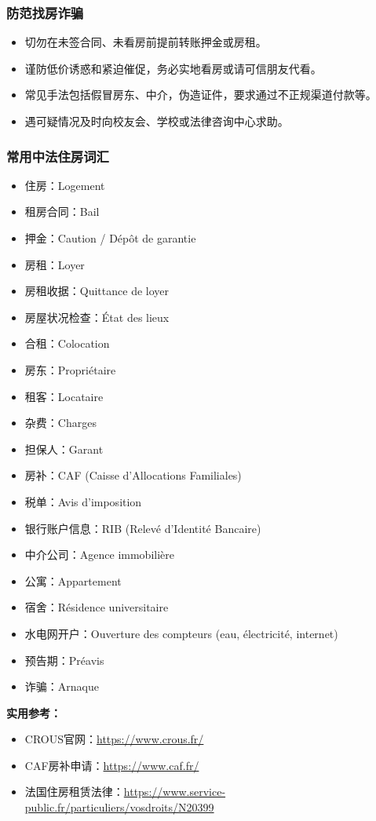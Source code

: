 \subsubsection{防范找房诈骗}
\begin{itemize}
    \item 切勿在未签合同、未看房前提前转账押金或房租。
    \item 谨防低价诱惑和紧迫催促，务必实地看房或请可信朋友代看。
    \item 常见手法包括假冒房东、中介，伪造证件，要求通过不正规渠道付款等。
    \item 遇可疑情况及时向校友会、学校或法律咨询中心求助。
\end{itemize}

\subsubsection{常用中法住房词汇}
\begin{itemize}
    \item 住房：Logement
    \item 租房合同：Bail
    \item 押金：Caution / Dépôt de garantie
    \item 房租：Loyer
    \item 房租收据：Quittance de loyer
    \item 房屋状况检查：État des lieux
    \item 合租：Colocation
    \item 房东：Propriétaire
    \item 租客：Locataire
    \item 杂费：Charges
    \item 担保人：Garant
    \item 房补：CAF (Caisse d’Allocations Familiales)
    \item 税单：Avis d’imposition
    \item 银行账户信息：RIB (Relevé d’Identité Bancaire)
    \item 中介公司：Agence immobilière
    \item 公寓：Appartement
    \item 宿舍：Résidence universitaire
    \item 水电网开户：Ouverture des compteurs (eau, électricité, internet)
    \item 预告期：Préavis
    \item 诈骗：Arnaque
\end{itemize}

\textbf{实用参考：}
\begin{itemize}
    \item CROUS官网：\url{https://www.crous.fr/}
    \item CAF房补申请：\url{https://www.caf.fr/}
    \item 法国住房租赁法律：\url{https://www.service-public.fr/particuliers/vosdroits/N20399}
\end{itemize}
